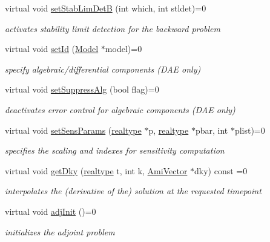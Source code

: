 \begin{DoxyCompactItemize}
virtual void \mbox{\hyperlink{classamici_1_1_solver_acb7f8ad7671faf5fa7e5fa7851e662ec}{set\+Stab\+Lim\+DetB}} (int which, int stldet)=0
\begin{DoxyCompactList}\small\item\em activates stability limit detection for the backward problem \end{DoxyCompactList}\item 
virtual void \mbox{\hyperlink{classamici_1_1_solver_a5c1ec0904b36a63c3d8adc74ffbb3718}{set\+Id}} (\mbox{\hyperlink{classamici_1_1_model}{Model}} $\ast$model)=0
\begin{DoxyCompactList}\small\item\em specify algebraic/differential components (D\+AE only) \end{DoxyCompactList}\item 
virtual void \mbox{\hyperlink{classamici_1_1_solver_aaf6b0aa0540ff3600fdcc555f721e147}{set\+Suppress\+Alg}} (bool flag)=0
\begin{DoxyCompactList}\small\item\em deactivates error control for algebraic components (D\+AE only) \end{DoxyCompactList}\item 
virtual void \mbox{\hyperlink{classamici_1_1_solver_ac729d2b36333e1bb658a1ca1a717bd9a}{set\+Sens\+Params}} (\mbox{\hyperlink{namespaceamici_a1bdce28051d6a53868f7ccbf5f2c14a3}{realtype}} $\ast$p, \mbox{\hyperlink{namespaceamici_a1bdce28051d6a53868f7ccbf5f2c14a3}{realtype}} $\ast$pbar, int $\ast$plist)=0
\begin{DoxyCompactList}\small\item\em specifies the scaling and indexes for sensitivity computation \end{DoxyCompactList}\item 
virtual void \mbox{\hyperlink{classamici_1_1_solver_abea88e1516775b1307f8ad837913ebc0}{get\+Dky}} (\mbox{\hyperlink{namespaceamici_a1bdce28051d6a53868f7ccbf5f2c14a3}{realtype}} t, int k, \mbox{\hyperlink{classamici_1_1_ami_vector}{Ami\+Vector}} $\ast$dky) const =0
\begin{DoxyCompactList}\small\item\em interpolates the (derivative of the) solution at the requested timepoint \end{DoxyCompactList}\item 
virtual void \mbox{\hyperlink{classamici_1_1_solver_a5c0a23a7a9c8d21c76e0b1e6ef6e1947}{adj\+Init}} ()=0
\begin{DoxyCompactList}\small\item\em initializes the adjoint problem \end{DoxyCompactList}\item 

\end{DoxyCompactItemize}
